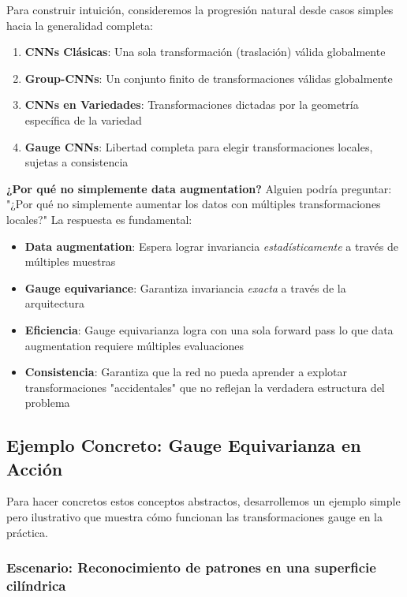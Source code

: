 Para construir intuición, consideremos la progresión natural desde casos simples hacia la generalidad completa:

\begin{enumerate}
    \item \textbf{CNNs Clásicas}: Una sola transformación (traslación) válida globalmente
    \item \textbf{Group-CNNs}: Un conjunto finito de transformaciones válidas globalmente  
    \item \textbf{CNNs en Variedades}: Transformaciones dictadas por la geometría específica de la variedad
    \item \textbf{Gauge CNNs}: Libertad completa para elegir transformaciones locales, sujetas a consistencia
\end{enumerate}

\textbf{¿Por qué no simplemente data augmentation?} Alguien podría preguntar: "¿Por qué no simplemente aumentar los datos con múltiples transformaciones locales?" La respuesta es fundamental:

\begin{itemize}
    \item \textbf{Data augmentation}: Espera lograr invariancia \textit{estadísticamente} a través de múltiples muestras
    \item \textbf{Gauge equivariance}: Garantiza invariancia \textit{exacta} a través de la arquitectura
    \item \textbf{Eficiencia}: Gauge equivarianza logra con una sola forward pass lo que data augmentation requiere múltiples evaluaciones
    \item \textbf{Consistencia}: Garantiza que la red no pueda aprender a explotar transformaciones "accidentales" que no reflejan la verdadera estructura del problema
\end{itemize}

\subsection{Ejemplo Concreto: Gauge Equivarianza en Acción}\label{subsec:ejemplo_gauge_equivarianza}

Para hacer concretos estos conceptos abstractos, desarrollemos un ejemplo simple pero ilustrativo que muestra cómo funcionan las transformaciones gauge en la práctica.

\subsubsection{Escenario: Reconocimiento de patrones en una superficie cilíndrica}

